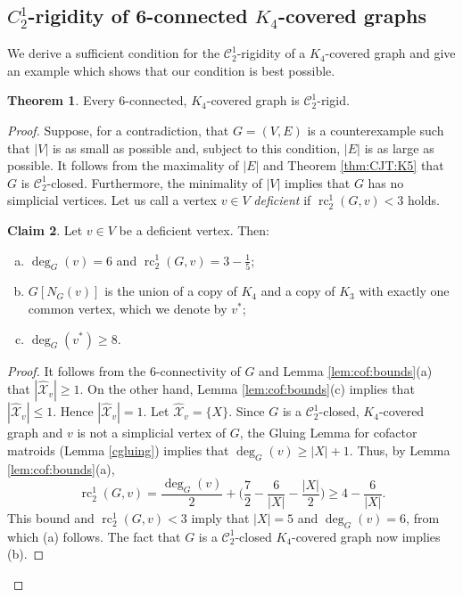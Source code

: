 \documentclass[11pt,a4paper]{article}
\theoremstyle{definition}
\newtheorem{theorem}{Theorem}[section]
\newtheorem{claim}[theorem]{Claim}
\DeclareMathOperator{\rc}{rc}
\newcommand{\hXX}{\hat{\mathcal{X}}}
\newcommand{\cC}{\mathcal{C}}
\begin{document}
\subsection{\boldmath $C_2^1$-rigidity of 6-connected $K_4$-covered graphs}
We derive a sufficient condition for the $\cC_2^1$-rigidity of a $K_4$-covered graph and give an example which shows that our condition is best possible.




\begin{theorem}\label{thm:zeo:general}
Every 6-connected, $K_4$-covered graph is $\cC_2^1$-rigid.
\end{theorem}

\begin{proof}
Suppose, for a contradiction,  that $G=(V,E)$ is a counterexample such that $|V|$ is as small as possible and,
subject to this condition, $|E|$ is as large as possible. It follows from the maximality of $|E|$ and Theorem \ref{thm:CJT:K5} that $G$ is $\cC_2^1$-closed.
Furthermore,   the minimality of $|V|$ implies that  
$G$ has no simplicial vertices.
Let us call a vertex $v\in V$ {\it deficient} if $\rc_2^1(G,v)<3$ holds.

\begin{claim}\label{claim:deficient}
Let $v\in V$ be a deficient vertex. Then:
\begin{enumerate}[(a)]
\item $\deg_G(v)=6$ and $\rc_2^1(G,v)=3-\frac{1}{5}$;
\item $G[N_G(v)]$ is the union of a copy of $K_4$ and a copy of $K_3$ with exactly one common vertex, which we denote by $v^*$; 
\item $\deg_G(v^*)\geq 8.$
\end{enumerate}
\end{claim}
\begin{proof} It follows from the 6-connectivity of $G$ and Lemma \ref{lem:cof:bounds}(a) that $|\hXX_v|\geq 1$. On the other hand, Lemma \ref{lem:cof:bounds}(c) implies that $|\hXX_v|\leq 1.$ Hence
$|\hXX_v|= 1$. Let $\hXX_v=\{X\}$. Since $G$ is a $\cC_2^1$-closed, $K_4$-covered graph and $v$ is not a simplicial vertex of $G$, the Gluing Lemma for cofactor matroids 
(Lemma \ref{cgluing}) implies that $\deg_G(v)\geq |X|+1$. Thus, by Lemma \ref{lem:cof:bounds}(a), 
$$\rc_2^1(G,v)=\frac{\deg_G(v)}{2}+\Big(\frac{7}{2}-\frac{6}{|X|}-\frac{|X|}{2}\Big)\geq 4-\frac{6}{|X|}.$$
This bound and
$\rc_2^1(G,v)<3$ imply that $|X|=5$ and $\deg_G(v)=6$, from which (a) follows.
The fact that $G$ is a $\cC_2^1$-closed $K_4$-covered graph now implies (b).


\end{proof}
\end{proof}
\end{document}
